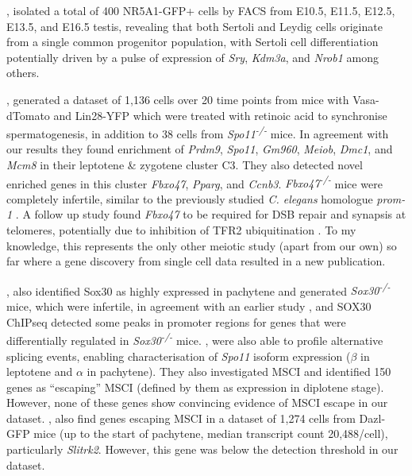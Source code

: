 \cite{Stevant2018Deciphering}, isolated a total of 400 NR5A1-GFP+ cells by FACS from E10.5, E11.5, E12.5, E13.5, and E16.5 testis, revealing that both Sertoli and Leydig cells originate from a single common progenitor population, with Sertoli cell differentiation potentially driven by a pulse of expression of \textit{Sry}, \textit{Kdm3a}, and \textit{Nrob1} among others.

\cite{Chen2018Singlecell}, generated a dataset of 1,136 cells over 20 time points from mice with Vasa-dTomato and Lin28-YFP which were treated with retinoic acid to synchronise spermatogenesis, in addition to 38 cells from \textit{Spo11\textsuperscript{-/-}} mice.
In agreement with our results they found enrichment of \textit{Prdm9}, \textit{Spo11}, \textit{Gm960}, \textit{Meiob}, \textit{Dmc1}, and \textit{Mcm8} in their leptotene \& zygotene cluster C3.
They also detected novel enriched genes in this cluster \textit{Fbxo47}, \textit{Pparg}, and \textit{Ccnb3}.
\textit{Fbxo47\textsuperscript{-/-}} mice were completely infertile, similar to the previously studied \textit{C. elegans} homologue \textit{prom-1} \parencite{Jantsch2007Caenorhabditis}.
A follow up study found \textit{Fbxo47} to be required for DSB repair and synapsis at telomeres, potentially due to inhibition of TFR2 ubiquitination \parencite{Hua2019FBXO47}.
To my knowledge, this represents the only other meiotic study (apart from our own) so far where a gene discovery from single cell data resulted in a new publication.

\cite{Chen2018Singlecell}, also identified Sox30 as highly expressed in pachytene and generated \textit{Sox30\textsuperscript{-/-}} mice, which were infertile, in agreement with an earlier study \parencite{Feng2017SOX30}, and SOX30 ChIPseq detected some peaks in promoter regions for genes that were differentially regulated in \textit{Sox30\textsuperscript{-/-}} mice.
\cite{Chen2018Singlecell}, were also able to profile alternative splicing events, enabling characterisation of \textit{Spo11} isoform expression ($\beta$ in leptotene and $\alpha$ in pachytene).
They also investigated MSCI and identified 150 genes as ``escaping'' MSCI (defined by them as expression in diplotene stage).
However, none of these genes show convincing evidence of MSCI escape in our dataset.
\cite{Vertesy2019Dynamics}, also find genes escaping MSCI in a dataset of 1,274 cells from Dazl-GFP mice (up to the start of pachytene, median transcript count 20,488/cell), particularly \textit{Slitrk2}.
However, this gene was below the detection threshold in our dataset.

